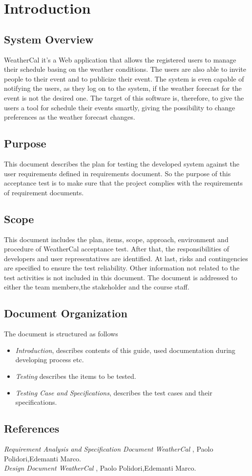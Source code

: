 \chapter{Introduction} \label{cap:cap1}
\section{System Overview}
WeatherCal  it's a Web application that allows the registered users to manage their schedule basing on the weather conditions. The users are also able to invite people to their event and to publicize their event. The system is even capable of notifying the users, as they log on to the system, if the weather forecast for the event is not the desired one. The target of this software is, therefore, to give the users a tool for schedule their events smartly, giving the possibility to change preferences as the weather forecast changes.
\section{Purpose}
This document describes the plan for testing the developed system against the user requirements defined in requirements document. So the purpose of this acceptance test is to make sure that the project complies with the requirements of requirement documents.
\section{Scope}
This document includes the plan, items, scope, approach, environment and procedure of WeatherCal acceptance test. After that, the responsibilities of developers and user representatives are identified. At last, risks and contingencies are specified to ensure the test reliability. Other information not related to the test activities is not included in this document.
The document is addressed to either the team members,the  stakeholder and the course staff.
\section{Document Organization}
The document is structured as follows 
\begin{itemize}
\item {\it Introduction}, describes contents of this guide, used documentation during developing process etc.
\item {\it Testing} describes the items to be tested.
\item {\it Testing Case and Specifications}, describes the test cases and their specifications.
\end{itemize}
\section{References}
{\it Requirement Analysis and Specification Document WeatherCal },  Paolo Polidori,Edemanti Marco.\\
{\it Design Document WeatherCal },  Paolo Polidori,Edemanti Marco.

 
 
 
 
 
 